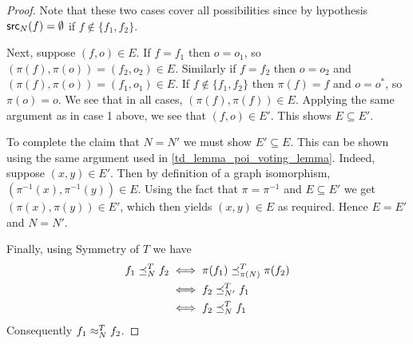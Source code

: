 \begin{proof}
Note that these two cases cover all possibilities since by hypothesis
$\mathsf{src}_{N}(f) = \emptyset$ if $f \notin \{f_1, f_2\}$.

Next, suppose $(f, o) \in E$. If $f = f_1$ then $o = o_1$, so $(\pi(f),
\pi(o)) = (f_2, o_2) \in E$. Similarly if $f = f_2$ then $o = o_2$ and
$(\pi(f), \pi(o)) = (f_1, o_1) \in E$. If $f \notin \{f_1, f_2\}$ then $\pi(f)
= f$ and $o = o^*$, so $\pi(o) = o$. We see that in all cases, $(\pi(f),
\pi(f)) \in E$. Applying the same argument as in case 1 above, we see that
$(f, o) \in E'$. This shows $E \subseteq E'$.

To complete the claim that $N = N'$ we must show $E' \subseteq E$. This can be
shown using the same argument used in \cref{td_lemma_poi_voting_lemma}.
Indeed, suppose $(x, y) \in E'$. Then by definition of a graph isomorphism,
$(\pi^{-1}(x), \pi^{-1}(y)) \in E$. Using the fact that $\pi=\pi^{-1}$
and $E \subseteq E'$ we get $(\pi(x), \pi(y)) \in E'$, which then yields $(x,
y) \in E$ as required. Hence $E = E'$ and $N = N'$.

Finally, using Symmetry of $T$ we have
\begin{align*}
    f_1 \preceq_N^T f_2 & \iff
    \pi(f_1) \preceq_{\pi(N)}^T \pi(f_2) \\ & \iff
    f_2 \preceq_{N'}^T f_1 \\ & \iff
    f_2 \preceq_N^T f_1
\end{align*}
Consequently $f_1 \approx_N^T f_2$.
\end{proof}

